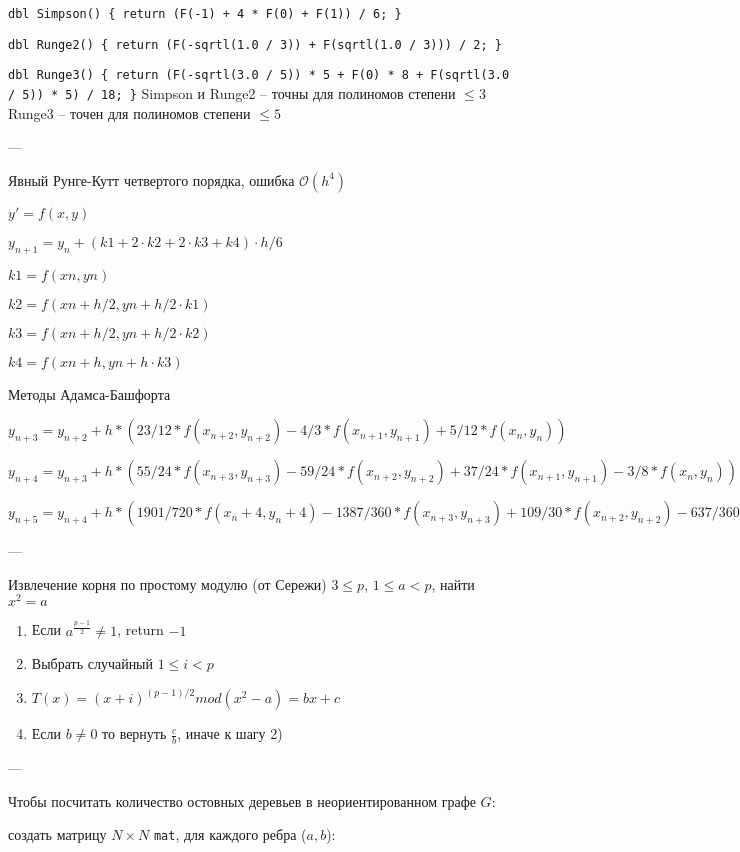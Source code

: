 \texttt{dbl Simpson() \{ return (F(-1) + 4 * F(0) + F(1)) / 6; \}}

\texttt{dbl Runge2() \{ return (F(-sqrtl(1.0 / 3)) + F(sqrtl(1.0 / 3))) / 2; \}}

\texttt{dbl Runge3() \{ return (F(-sqrtl(3.0 / 5)) * 5 + F(0) * 8 + F(sqrtl(3.0 / 5)) * 5) / 18; \}}
Simpson и Runge2 -- точны для полиномов степени $\le 3$
Runge3 -- точен для полиномов степени $\le 5$

---

Явный Рунге-Кутт четвертого порядка, ошибка $\mathcal{O}(h^4)$

$y' = f(x, y)$

$y_{n+1} = y_n + (k1 + 2 \cdot k2 + 2 \cdot k3 + k4) \cdot h / 6$

$k1 = f(xn, yn)$

$k2 = f(xn + h/2, yn + h/2 \cdot k1)$

$k3 = f(xn + h/2, yn + h/2 \cdot k2)$

$k4 = f(xn + h, yn + h \cdot k3)$

Методы Адамса-Башфорта

$y_{n+3} = y_{n+2} + h * (23/12 * f(x_{n+2},y_{n+2}) - 4/3 * f(x_{n+1},y_{n+1}) + 5/12 * f(x_n,y_n))$

$y_{n+4} = y_{n+3} + h * (55/24 * f(x_{n+3},y_{n+3}) - 59/24 * f(x_{n+2},y_{n+2}) + 37/24 * f(x_{n+1},y_{n+1}) - 3/8 * f(x_n,y_n))$

$y_{n+5} = y_{n+4} + h * (1901/720 * f(x_n+4,y_n+4) - 1387/360 * f(x_{n+3},y_{n+3})
    + 109/30 * f(x_{n+2},y_{n+2}) - 637/360 * f(x_{n+1},y_{n+1}) + 251/720 * f(x_n,y_n))$

---

Извлечение корня по простому модулю (от Сережи)
$3 \leq p$, $1 \leq a < p$, найти $x^2 = a$
\begin{enumerate}
\item Если $a^{\frac{p - 1}{2}} \ne 1$, return $-1$
\item Выбрать случайный $1 \leq i < p$
\item $T(x) = (x + i)^{(p - 1)/2} mod (x^2 - a) = bx + c$
\item Если $b \ne 0$ то вернуть $\frac{c}{b}$, иначе к шагу 2)
\end{enumerate}

---

Чтобы посчитать количество остовных деревьев в неориентированном графе $G$:

    создать матрицу $N \times N$ \texttt{mat}, для каждого ребра ($a, b$):
    
